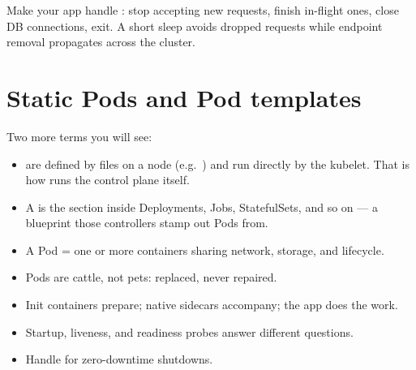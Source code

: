 \begin{protip}
Make your app handle : stop accepting new requests, finish
in-flight ones, close DB connections, exit. A short  sleep avoids
dropped requests while endpoint removal propagates across the cluster.
\end{protip}

\section{Static Pods and Pod templates}

Two more terms you will see:

\begin{itemize}
  \item {} are defined by files on a node (e.g.\
        ) and run directly by the kubelet.
        That is how \kc{kubeadm} runs the control plane itself.
  \item A  is the  section inside
        Deployments, Jobs, StatefulSets, and so on --- a blueprint those
        controllers stamp out Pods from.
\end{itemize}

\begin{recap}
\begin{itemize}
  \item A Pod = one or more containers sharing network, storage, and lifecycle.
  \item Pods are cattle, not pets: replaced, never repaired.
  \item Init containers prepare; native sidecars accompany; the app does the work.
  \item Startup, liveness, and readiness probes answer different questions.
  \item Handle \kc{SIGTERM} for zero-downtime shutdowns.
\end{itemize}
\end{recap}

